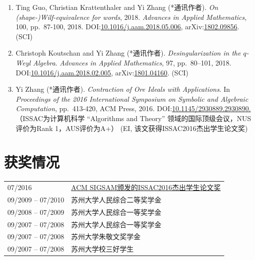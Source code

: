 \documentclass[a4paper,12pt]{article}
\newcommand{\red}{\color{red}}
\begin{document}
\begin{CJK*}{UTF8}{gbsn}
\begin{enumerate}
 {\em  Journal of Symbolic Computation}, 95, pp.\ 217-237, 2019. arXiv:\href{http://arxiv.org/abs/1705.00838}{1705.00838},  
 DOI:\href{https://doi.org/10.1016/j.jsc.2019.02.009}{10.1016/j.jsc.2019.02.009}. (SCI)
\item Ting Guo, Christian Krattenthaler and Yi Zhang (*通讯作者).
{\em On (shape-)Wilf-equivalence for words}, 2018.
{\em  Advances in Applied Mathematics}, 100, pp.\ 87-100, 2018. 
DOI:\href{https://doi.org/10.1016/j.aam.2018.05.006}{10.1016/j.aam.2018.05.006}, 
arXiv:\href{https://arxiv.org/pdf/1802.09856.pdf}{1802.09856}. (SCI)
\item Christoph Koutschan and Yi Zhang (*通讯作者). {\em Desingularization in the $q$-Weyl Algebra}. 
{\em Advances in Applied Mathematics}, 97, pp.\ 80–101, 2018. \\
DOI:\href{http://dx.doi.org/10.1016/j.aam.2018.02.005}{10.1016/j.aam.2018.02.005},
arXiv:\href{https://arxiv.org/abs/1801.04160}{1801.04160}. (SCI) 
\item Yi Zhang (*通讯作者). {\em Contraction of Ore Ideals with Applications}. 
In {\em Proceedings of the 2016 International Symposium on Symbolic and Algebraic Computation}, 
pp.\ 413-420, ACM Press, 2016. DOI:\href{http://dl.acm.org/citation.cfm?id=2930890}{10.1145/2930889.2930890.} 
{\red （ISSAC为计算机科学 
“Algorithms and Theory”
领域的国际顶级会议，NUS评价为Rank 1，AUS评价为A+） (EI, 该文获得ISSAC2016杰出学生论文奖)} 
\end{enumerate}

\section*{\Large{获奖情况}}
\begin{tabular}{@{}p{1.4in}p{4in}}
07/2016               & \href{https://www.sigsam.org/Awards/ISSACAwards.html}{ACM SIGSAM颁发的ISSAC2016杰出学生论文奖} \\
09/2009 -- 07/2010    & 苏州大学人民综合二等奖学金\\
09/2008 -- 07/2009    & 苏州大学人民综合一等奖学金 \\
09/2007 -- 07/2008    & 苏州大学人民综合一等奖学金 \\ 
09/2007 -- 07/2008    & 苏州大学朱敬文奖学金 \\
09/2007 -- 07/2008    & 苏州大学校三好学生
\end{tabular}


\end{CJK*}
\end{document}

